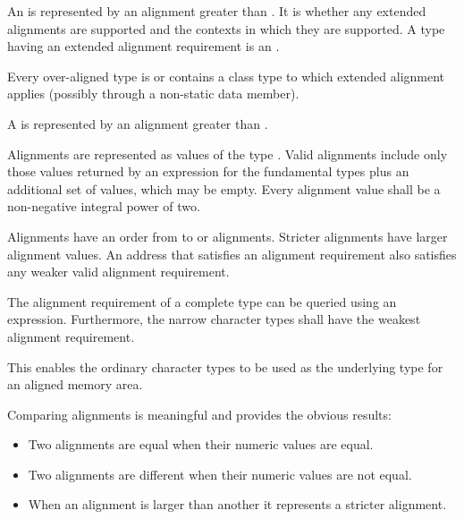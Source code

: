 \pnum
An  is represented by an alignment
greater than . It is 
whether any extended alignments are supported and the contexts in which they are
supported. A type having an extended alignment
requirement is an .
\begin{note}
Every over-aligned type is or contains a class type
to which extended alignment applies (possibly through a non-static data member).
\end{note}
A  is represented by
an alignment greater than .

\pnum
Alignments are represented as values of the type .
Valid alignments include only those values returned by an 
expression for the fundamental types plus an additional 
set of values, which may be empty.
Every alignment value shall be a non-negative integral power of two.

\pnum
Alignments have an order from  to
 or  alignments. Stricter
alignments have larger alignment values. An address that satisfies an alignment
requirement also satisfies any weaker valid alignment requirement.

\pnum
The alignment requirement of a complete type can be queried using an
 expression. Furthermore,
the narrow character types shall have the weakest
alignment requirement.
\begin{note}
This enables the ordinary character types to be used as the
underlying type for an aligned memory area.
\end{note}

\pnum
Comparing alignments is meaningful and provides the obvious results:

\begin{itemize}
\item Two alignments are equal when their numeric values are equal.
\item Two alignments are different when their numeric values are not equal.
\item When an alignment is larger than another it represents a stricter alignment.
\end{itemize}

